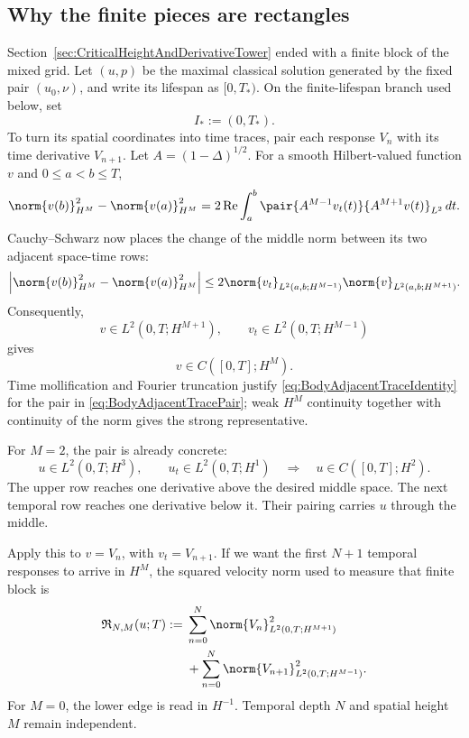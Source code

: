 \subsection{Why the finite pieces are rectangles}\label{sub:BodyFiniteAdjacentRectangles}

Section~\ref{sec:CriticalHeightAndDerivativeTower} ended with a finite block of the mixed grid.
Let \((u,p)\) be the maximal classical solution generated by the fixed pair \((u_0,\nu)\), and write its lifespan as \([0,T_*)\).
On the finite-lifespan branch used below, set
\[
  I_*:=(0,T_*).
\]
To turn its spatial coordinates into time traces, pair each response \(V_n\) with its time derivative \(V_{n+1}\).
Let
\(A=(1-\Delta)^{1/2}\).  For a smooth Hilbert-valued function \(v\) and
\(0\leq a<b\leq T\),
\begin{equation}\label{eq:BodyAdjacentTraceIdentity}
  \norm{v(b)}_{H^M}^2-
  \norm{v(a)}_{H^M}^2
  =2\operatorname{Re}
  \int_a^b
  \pair{A^{M-1}v_t(t)}{A^{M+1}v(t)}_{L^2}\,dt.
\end{equation}
Cauchy--Schwarz now places the change of the middle norm between its two adjacent
space-time rows:
\[
  \left|
  \norm{v(b)}_{H^M}^2-
  \norm{v(a)}_{H^M}^2
  \right|
  \leq
  2\norm{v_t}_{L^2(a,b;H^{M-1})}
   \norm{v}_{L^2(a,b;H^{M+1})}.
\]
Consequently,
\begin{equation}\label{eq:BodyAdjacentTracePair}
  v\in L^2(0,T;H^{M+1}),
  \qquad
  v_t\in L^2(0,T;H^{M-1})
\end{equation}
gives
\begin{equation}\label{eq:BodyAdjacentTraceConclusion}
  v\in C([0,T];H^M).
\end{equation}
Time mollification and Fourier truncation justify
\eqref{eq:BodyAdjacentTraceIdentity} for the pair in
\eqref{eq:BodyAdjacentTracePair}; weak \(H^M\) continuity together with continuity
of the norm gives the strong representative.

For \(M=2\), the pair is already concrete:
\begin{equation}\label{eq:FirstConcreteAdjacentPair}
  u\in L^2(0,T;H^3),
  \qquad
  u_t\in L^2(0,T;H^1)
  \quad\Longrightarrow\quad
  u\in C([0,T];H^2).
\end{equation}
The upper row reaches one derivative above the desired middle space.  The next
temporal row reaches one derivative below it.  Their pairing carries \(u\) through the
middle.

Apply this to \(v=V_n\), with \(v_t=V_{n+1}\).  If we want the first \(N+1\)
temporal responses to arrive in \(H^M\), the squared velocity norm used to measure that finite block is
\begin{equation}\label{eq:BodyRectangleNorm}
\begin{aligned}
  \mathfrak R_{N,M}(u;T)
  :={}&
  \sum_{n=0}^{N}
  \norm{V_n}_{L^2(0,T;H^{M+1})}^2
  \\
  &+
  \sum_{n=0}^{N}
  \norm{V_{n+1}}_{L^2(0,T;H^{M-1})}^2.
\end{aligned}
\end{equation}
For \(M=0\), the lower edge is read in \(H^{-1}\).  Temporal depth \(N\) and
spatial height \(M\) remain independent.

